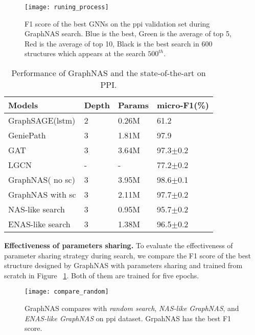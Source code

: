 \documentclass{article}
\begin{document}
\begin{figure}
	\texttt{[image: runing\_process]}
	\caption{F1 score of the best GNNs on the ppi validation set during GraphNAS search. Blue is the best, Green is the average of top 5, Red is the average of top 10, Black is the best search in 600 structures which appears at the search $500^{th}$.    }
	\label{fig:runing_process}
\end{figure}

\begin{table}[]
	\caption{Performance of GraphNAS and the state-of-the-art on PPI.}
	\label{PPI result}
	\begin{tabular}{l|ll|l}
		\hline
		Models    & Depth & Params  & micro-F1(\%)     \\ \hline
		GraphSAGE(lstm) &  2     &  0.26M       & 61.2       \\
GeniePath & 3  & 1.81M   &97.9  \\
		GAT       &   3    &  3.64M      & 97.3$\pm$0.2 \\
		LGCN      &  -     & -     & 77.2$\pm$0.2 \\ \hline


		GraphNAS( no sc) &	3	&	3.95M	&	 98.6$\pm$0.1			\\

		GraphNAS with sc&	3	&	2.11M	&	 	  97.7$\pm$0.2 \\
 
		NAS-like search &  3     &  0.95M    &  95.7$\pm$0.2                 \\ 
 
		ENAS-like search&  3     &  1.38M     &   96.5$\pm$0.2             \\ \hline
	\end{tabular}
\end{table}

\textbf{Effectiveness of parameters sharing.} To evaluate the effectiveness of parameter sharing strategy during search, we compare the F1 score of the best structure designed by GraphNAS with parameters sharing and trained from scratch in Figure ~\ref{fig:runing_process}. Both of them are trained for five epochs. 

\begin{figure}
	\texttt{[image: compare\_random]}
	\caption{GraphNAS compares with \textit{random search}, \textit{NAS-like GraphNAS}, and \textit{ ENAS-like GraphNAS} on ppi dataset. GrpahNAS has the best F1 score.}
	\label{fig:ppi_compare_random}
\end{figure}
\end{document}

